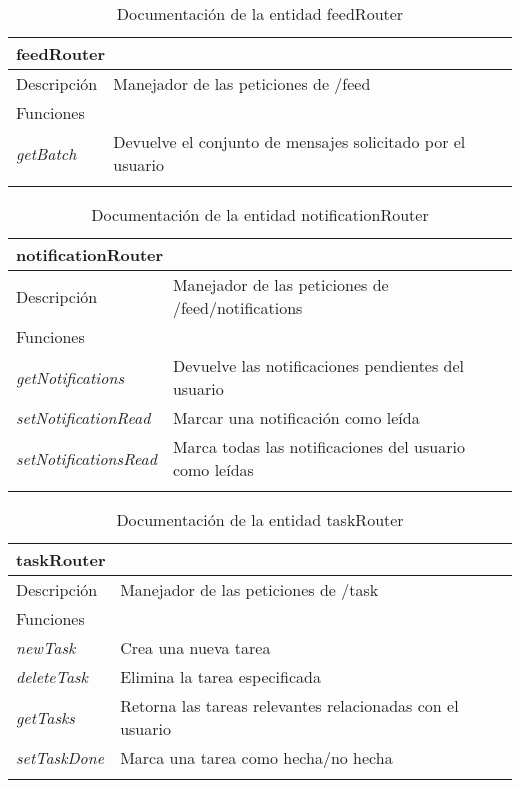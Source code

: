 \begin{longtable}{|p{} p{}|}
    \hline
    \multicolumn{2}{|l|}{\textbf{feedRouter}} \\ \hline \hline
    Descripción      & Manejador de las peticiones de /feed \\ \hline
    \multicolumn{2}{|l|}{Funciones} \\
    \emph{getBatch}  & Devuelve el conjunto de mensajes solicitado por el usuario  \\ \hline
    \caption{Documentación de la entidad feedRouter}
    \label{dis:api:feed_router}
\end{longtable}

\begin{longtable}{|p{} p{}|}
    \hline
    \multicolumn{2}{|l|}{\textbf{notificationRouter}} \\ \hline \hline
    Descripción      & Manejador de las peticiones de /feed/notifications \\ \hline
    \multicolumn{2}{|l|}{Funciones} \\
    \emph{getNotifications}  & Devuelve las notificaciones pendientes del usuario  \\ 
    \emph{setNotificationRead}  & Marcar una notificación como leída  \\ 
    \emph{setNotificationsRead}  & Marca todas las notificaciones del usuario como leídas  \\ \hline
    \caption{Documentación de la entidad notificationRouter}
    \label{dis:api:notification_router}
\end{longtable}

\begin{longtable}{|p{} p{}|}
    \hline
    \multicolumn{2}{|l|}{\textbf{taskRouter}} \\ \hline \hline
    Descripción      & Manejador de las peticiones de /task \\ \hline
    \multicolumn{2}{|l|}{Funciones} \\
    \emph{newTask}  & Crea una nueva tarea  \\ 
    \emph{deleteTask}  & Elimina la tarea especificada  \\ 
    \emph{getTasks}  & Retorna las tareas relevantes relacionadas con el usuario  \\ 
    \emph{setTaskDone}  & Marca una tarea como hecha/no hecha  \\ \hline
    \caption{Documentación de la entidad taskRouter}
    \label{dis:api:task_router}
\end{longtable}

